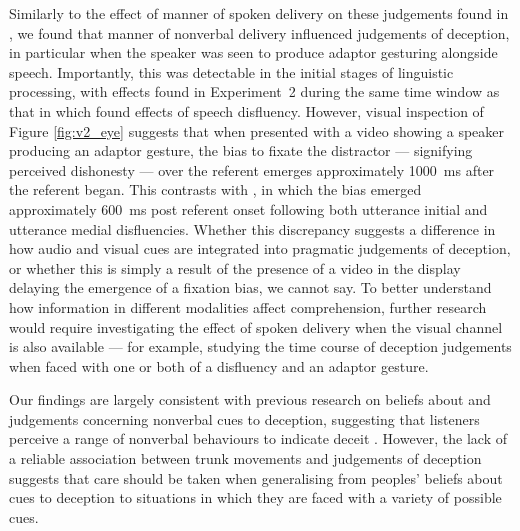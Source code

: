 \documentclass[a4paper,man,natbib]{apa6}
\begin{document}
Similarly to the effect of manner of spoken delivery on these judgements found in \citet{Loy2017}, we found that manner of nonverbal delivery influenced judgements of deception, in particular when the speaker was seen to produce adaptor gesturing alongside speech.
Importantly, this was detectable in the initial stages of linguistic processing, with effects found in Experiment~2 during the same time window as that in which \citet{Loy2017} found effects of speech disfluency.
However, visual inspection of Figure \ref{fig:v2_eye} suggests that when presented with a video showing a speaker producing an adaptor gesture, the bias to fixate the distractor --- signifying perceived dishonesty --- over the referent emerges approximately 1000~ms after the referent began. 
This contrasts with \citet{Loy2017}, in which the bias emerged approximately 600~ms post referent onset following both utterance initial and utterance medial disfluencies. 
Whether this discrepancy suggests a difference in how audio and visual cues are integrated into pragmatic judgements of deception, or whether this is simply a result of the presence of a video in the display delaying the emergence of a fixation bias, we cannot say. 
To better understand how information in different modalities affect comprehension, further research would require investigating the effect of spoken delivery when the visual channel is also available --- for example, studying the time course of deception judgements when faced with one or both of a disfluency and an adaptor gesture.

Our findings are largely consistent with previous research on beliefs about and judgements concerning nonverbal cues to deception, suggesting that listeners perceive a range of nonverbal behaviours to indicate deceit \citep[e.g.][]{Akehurst1996, Vrij2000}.
However, the lack of a reliable association between trunk movements and judgements of deception suggests that care should be taken when generalising from peoples' beliefs about cues to deception \citep[e.g.][]{Vrij1996a, Zuckerman1981} to situations in which they are faced with a variety of possible cues.
\end{document}
